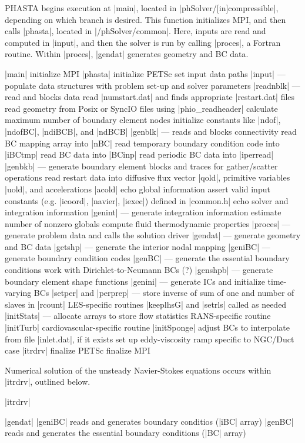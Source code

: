 \documentclass[11pt]{article}
\begin{document}
PHASTA begins execution at |main|, located in |phSolver/[in]compressible|, depending on which branch is desired. This function initializes MPI, and then calls |phasta|, located in |/phSolver/common|. Here, inputs are read and computed in |input|, and then the solver is run by calling |proces|, a Fortran routine. Within |proces|, |gendat| generates geometry and BC data.
\begin{outline}[deep]
\1 |main|
	\2 initialize MPI
	\2 |phasta|
		\3 initialize PETSc
		\3 set input data paths
		\3 |input| --- populate data structures with problem set-up and solver parameters
			\4 |readnblk| --- read and blocks data
				\5 read |numstart.dat| and finds appropriate |restart.dat| files
				\5 read geometry from Posix or SyncIO files using |phio_readheader|
				\5 calculate maximum number of boundary element nodes
				\5 initialize constants like |ndof|, |ndofBC|, |ndiBCB|, and |ndBCB|
				\5 |genblk| --- reads and blocks connectivity
				\5 read BC mapping array into |nBC|
				\5 read temporary boundary condition code into |iBCtmp|
				\5 read BC data into |BCinp|
				\5 read periodic BC data into |iperread|
				\5 |genbkb| --- generate boundary element blocks and traces for gather/scatter operations
				\5 read restart data into diffusive flux vector |qold|, primitive variables |uold|, and accelerations |acold|
			\4 echo global information
			\4 assert valid input constants (e.g. |icoord|, |navier|, |iexec|) defined in |common.h|
			\4 echo solver and integration information
			\4 |genint| --- generate integration information
			\4 estimate number of nonzero globals
			\4 compute fluid thermodynamic properties
		\3 |proces| --- generate problem data and calls the solution driver
			\4 |gendat| --- generate geometry and BC data
				\5 |getshp| --- generate the interior nodal mapping
				\5 |geniBC| --- generate boundary condition codes
				\5 |genBC| --- generate the essential boundary conditions
				\5 work with Dirichlet-to-Neumann BCs (?)
				\5 |genshpb| --- generate boundary element shape functions
				\5 |genini| --- generate ICs and initialize time-varying BCs
			\4 |setper| and |perprep| --- store inverse of sum of one and number of slaves in |rcount|
			\4 LES-specific routines |keeplhsG| and |setrls| called as needed
			\4 |initStats| --- allocate arrays to store flow statistics
			\4 RANS-specific routine |initTurb|
			\4 cardiovascular-specific routine |initSponge|
			\4 adjust BCs to interpolate from file |inlet.dat|, if it exists
			\4 set up eddy-viscosity ramp specific to NGC/Duct case
			\4 |itrdrv|
		\3 finalize PETSc
	\2 finalize MPI
\end{outline}

Numerical solution of the unsteady Navier-Stokes equations occurs within |itrdrv|, outlined below.
\begin{outline}[deep]
\1 |itrdrv|
\end{outline}
		
\begin{outline}[deep]
\1 |gendat|
	\2 |geniBC| reads and generates boundary conditios (|iBC| array)
	\2 |genBC| reads and generates the essential boundary conditions (|BC| array)
\end{outline}

\label{lastpage}
\end{document}
